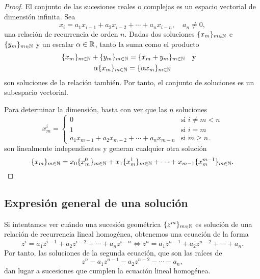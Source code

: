\begin{proof}
    El conjunto de las sucesiones reales o complejas
    es un espacio vectorial de dimensión infinita.
    Sea
    \begin{equation*}
        x_i = a_1x_{i-1} + a_2x_{i-2} + \cdots + a_nx_{i-n},
        \quad a_n \ne 0,
    \end{equation*}
    una relación de recurrencia de orden $n$.
    Dadas dos soluciones $\{x_m\}_{m \in \mathbb{N}}$ e $\{y_m\}_{m \in \mathbb{N}}$
    y un escalar $\alpha \in \mathbb{R}$,
    tanto la suma como el producto
    \begin{gather*}
        \{x_m\}_{m \in \N} + \{y_m\}_{m \in \N} =
            \{x_m + y_m\}_{m \in \N} \qq{y} \\
        \alpha\{x_m\}_{m \in \N} =
            \{\alpha x_m\}_{m \in \N}
    \end{gather*}
    son soluciones de la relación también.
    Por tanto, el conjunto de soluciones es un subespacio vectorial.

    Para determinar la dimensión, basta con ver que las $n$ soluciones
    \begin{equation*}
        x^i_m =
        \begin{cases}
            0 & \text{si $i \ne m < n$} \\
            1 & \text{si $i = m$} \\
            a_1x_{m-1} + a_2x_{m-2} + \cdots + a_nx_{m-n}
                & \text{si $m \ge n$.}
        \end{cases}
    \end{equation*}
    son linealmente independientes y generan cualquier otra solución
    \begin{equation*}
        \{x_m\}_{m \in \mathbb{N}} =
        x_0\{x^0_m\}_{m \in \mathbb{N}} + x_1\{x^1_m\}_{m \in \mathbb{N}} + \cdots +
        x_{m-1}\{x^{m-1}_m\}_{m \in \mathbb{N}}. \qedhere
    \end{equation*}
\end{proof}

\subsection{Expresión general de una solución}

Si intentamos ver cuándo una sucesión geométrica $\{z^m\}_{m \in \mathbb{N}}$
es solución de una relación de recurrencia lineal homogénea,
obtenemos una ecuación de la forma
\begin{equation*}
    z^i = a_1z^{i-1} + a_2z^{i-2} + \cdots + a_nz^{i-n} \iff
    z^n = a_1z^{n-1} + a_2z^{n-2} + \cdots + a_n.
\end{equation*}
Por tanto, las soluciones de la segunda ecuación,
que son las raíces de
\begin{equation*}
    z^n - a_1z^{n-1} - a_2z^{n-2} - \cdots - a_n,
\end{equation*}
dan lugar a sucesiones que cumplen la ecuación lineal homogénea.

